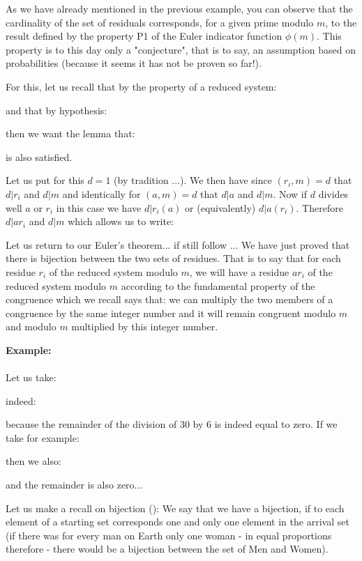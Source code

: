 \begin{dem}
	\begin{tcolorbox}[title=Remark,colframe=black,arc=10pt]
	As we have already mentioned in the previous example, you can observe that the cardinality of the set of residuals corresponds, for a given prime modulo $m$, to the result defined by the property P1 of the Euler indicator function $\phi(m)$. This property is to this day only a "conjecture", that is to say, an assumption based on probabilities (because it seems it has not be proven so far!).
	\end{tcolorbox}
	For this, let us recall that by the property of a reduced system:
	
	and that by hypothesis:
	
	then we want the lemma that:
	
	is also satisfied.
	
	Let us put for this $d=1$ (by tradition ...). We then have since $(r_i,m)=d$ that $d|r_i$ and $d|m$ and identically for $(a,m)=d$ that $d|a$ and $d|m$. Now if $d$ divides well $a$ or $r_i$ in this case we have $d|r_i(a)$ or (equivalently) $d|a(r_i)$. Therefore $d|ar_i$ and $d|m$ which allows us to write:
	
	Let us return to our Euler's theorem... if still follow ... We have just proved that there is bijection between the two sets of residues. That is to say that for each residue $r_i$ of the reduced system modulo $m$, we will have a residue $ar_i$ of the reduced system modulo $m$ according to the fundamental property of the congruence which we recall says that: we can multiply the two members of a congruence by the same integer number and it will remain congruent modulo $m$ and modulo $m$ multiplied by this integer number.
	
	\begin{tcolorbox}[colframe=black,colback=white,sharp corners]
	\textbf{{\Large {}}Example:}\\\\
	Let us take:
	
	indeed:
	
	because the remainder of the division of $30$ by $6$ is indeed equal to zero. If we take for example:
	
	then we also:
	
	and the remainder is also zero...
	\end{tcolorbox}
	Let us make a recall on bijection (): We say that we have a bijection, if to each element of a starting set corresponds one and only one element in the arrival set (if there was for every man on Earth only one woman - in equal proportions therefore - there would be a bijection between the set of Men and Women).


\end{dem}
